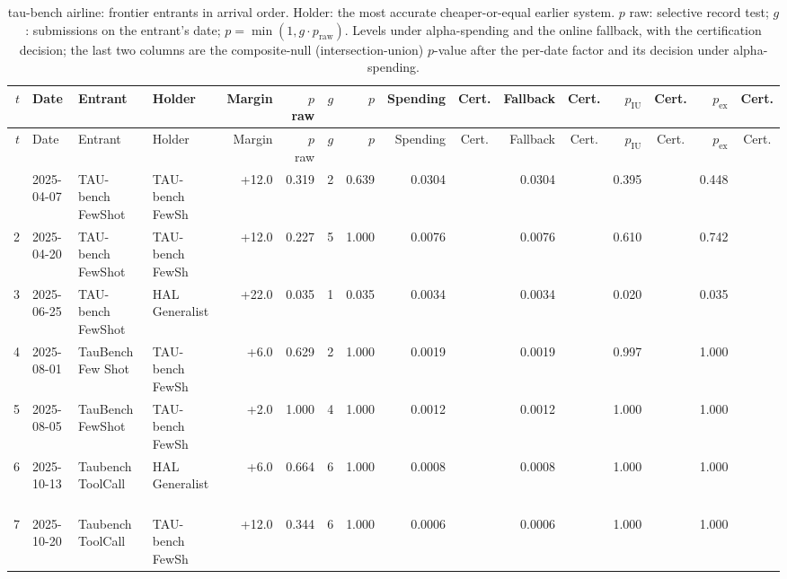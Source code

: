 {\begin{longtable}{rlllrrrrrcrcrcrc}
\caption{tau-bench airline: frontier entrants in arrival order. Holder: the most accurate cheaper-or-equal earlier system. $p$ raw: selective record test; $g$: submissions on the entrant's date; $p = \min(1, g \cdot p_{\mathrm{raw}})$. Levels under alpha-spending and the online fallback, with the certification decision; the last two columns are the composite-null (intersection-union) $p$-value after the per-date factor and its decision under alpha-spending.}\label{tab:supp-cert-hal_taubench_airline}\\
\toprule
$t$ & Date & Entrant & Holder & Margin & $p$ raw & $g$ & $p$ & Spending & Cert. & Fallback & Cert. & $p_{\mathrm{IU}}$ & Cert. & $p_{\mathrm{ex}}$ & Cert. \\
\midrule
\endfirsthead
\toprule
$t$ & Date & Entrant & Holder & Margin & $p$ raw & $g$ & $p$ & Spending & Cert. & Fallback & Cert. & $p_{\mathrm{IU}}$ & Cert. & $p_{\mathrm{ex}}$ & Cert. \\
\midrule
\endhead
\bottomrule
\endfoot
1 & 2025-04-07 & TAU-bench FewShot~ & TAU-bench FewSh~ & +12.0 & 0.319 & 2 & 0.639 & 0.0304 &  & 0.0304 &  & 0.395 &  & 0.448 &  \\
2 & 2025-04-20 & TAU-bench FewShot~ & TAU-bench FewSh~ & +12.0 & 0.227 & 5 & 1.000 & 0.0076 &  & 0.0076 &  & 0.610 &  & 0.742 &  \\
3 & 2025-06-25 & TAU-bench FewShot~ & HAL Generalist ~ & +22.0 & 0.035 & 1 & 0.035 & 0.0034 &  & 0.0034 &  & 0.020 &  & 0.035 &  \\
4 & 2025-08-01 & TauBench Few Shot~ & TAU-bench FewSh~ & +6.0 & 0.629 & 2 & 1.000 & 0.0019 &  & 0.0019 &  & 0.997 &  & 1.000 &  \\
5 & 2025-08-05 & TauBench FewShot ~ & TAU-bench FewSh~ & +2.0 & 1.000 & 4 & 1.000 & 0.0012 &  & 0.0012 &  & 1.000 &  & 1.000 &  \\
6 & 2025-10-13 & Taubench ToolCall~ & HAL Generalist ~ & +6.0 & 0.664 & 6 & 1.000 & 0.0008 &  & 0.0008 &  & 1.000 &  & 1.000 &  \\
7 & 2025-10-20 & Taubench ToolCall~ & TAU-bench FewSh~ & +12.0 & 0.344 & 6 & 1.000 & 0.0006 &  & 0.0006 &  & 1.000 &  & 1.000 &  \\
\end{longtable}

}
